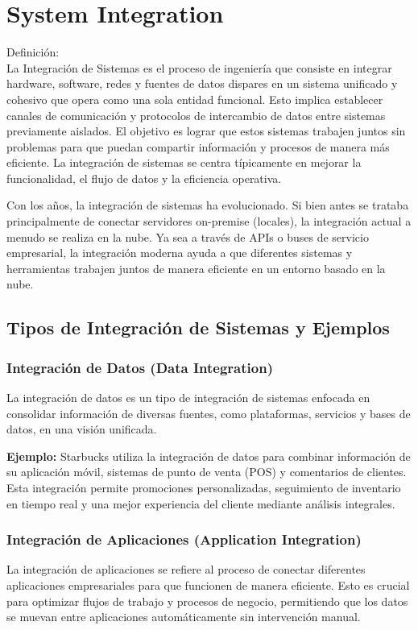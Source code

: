 \documentclass[12pt]{book}
\begin{document}
\section{System Integration}


Definición:\\
La Integración de Sistemas es el proceso de ingeniería que consiste en integrar hardware, 
software, redes y fuentes de datos dispares en un sistema unificado y cohesivo que opera 
como una sola entidad funcional. Esto implica establecer canales de comunicación y protocolos 
de intercambio de datos entre sistemas previamente aislados. El objetivo es lograr que estos
sistemas trabajen juntos sin problemas para que puedan compartir información y procesos de 
manera más eficiente. La integración de sistemas se centra típicamente en mejorar la 
funcionalidad, el flujo de datos y la eficiencia operativa.

Con los años, la integración de sistemas ha evolucionado. Si bien antes se trataba principalmente 
de conectar servidores on-premise (locales), la integración actual a menudo se realiza en la nube. 
Ya sea a través de APIs o buses de servicio empresarial, la integración moderna ayuda a que diferentes 
sistemas y herramientas trabajen juntos de manera eficiente en un entorno basado en la nube.

\subsection{Tipos de Integración de Sistemas y Ejemplos}
\subsubsection{Integración de Datos (Data Integration)}
La integración de datos es un tipo de integración de sistemas enfocada en consolidar información de diversas fuentes, como plataformas, servicios y bases de datos, en una visión unificada.

\textbf{Ejemplo:} Starbucks utiliza la integración de datos para combinar información de su aplicación móvil, sistemas de punto de venta (POS) y comentarios de clientes. Esta integración permite promociones personalizadas, seguimiento de inventario en tiempo real y una mejor experiencia del cliente mediante análisis integrales.

\subsubsection{Integración de Aplicaciones (Application Integration)}
La integración de aplicaciones se refiere al proceso de conectar diferentes aplicaciones empresariales para que funcionen de manera eficiente. Esto es crucial para optimizar flujos de trabajo y procesos de negocio, permitiendo que los datos se muevan entre aplicaciones automáticamente sin intervención manual.
\end{document}
